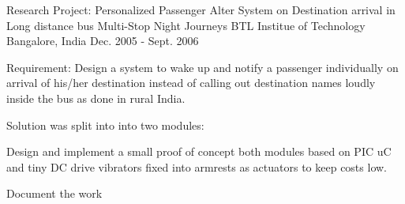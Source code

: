 \begin{cventries}
  \cventry
    {Research Project: Personalized Passenger Alter System on Destination arrival in Long distance bus Multi-Stop Night Journeys} %
    {BTL Institue of Technology} %
    {Bangalore, India} %
    {Dec. 2005 - Sept. 2006} %
    {
      \begin{cvitems} %
      	\item {Requirement: Design a system to wake up and notify a passenger individually on arrival of his/her destination instead of calling out destination names loudly inside the bus as done in rural India.}
      	\item {Solution was split into into two modules}:
      	\item {Design and implement a small proof of concept both modules based on PIC uC and tiny DC drive vibrators fixed into armrests as actuators to keep costs low.}
      	\item {Document the work}
      \end{cvitems}
    }
    
\end{cventries}
